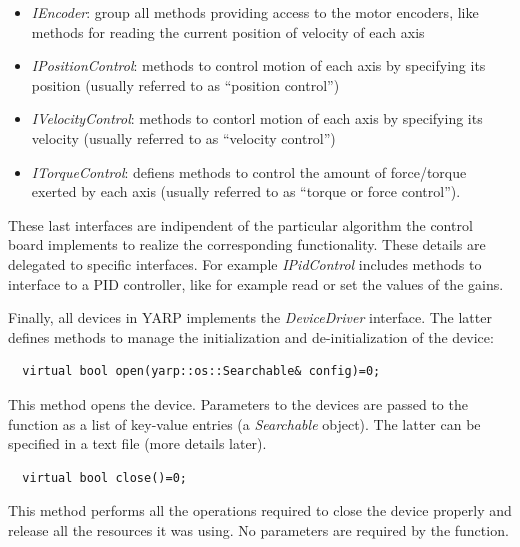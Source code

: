 \begin{itemize}

\item \emph{IEncoder}: group all methods providing access to the motor encoders, 
like methods for reading the current position of velocity of each axis

\item \emph{IPositionControl}: methods to control motion of each axis by specifying 
its position (usually referred to as ``position control'')

\item \emph{IVelocityControl}: methods to contorl motion of each axis by specifying 
its velocity (usually referred to as ``velocity control'')

\item \emph{ITorqueControl}: defiens methods to control the amount of force/torque 
exerted by each axis (usually referred to as ``torque or force control'').

\end{itemize}

These last interfaces are indipendent of the particular algorithm the control
board implements to realize the corresponding functionality. These details are 
delegated to specific interfaces. For example \emph{IPidControl} includes 
methods to interface to a PID controller, like for example read or set the 
values of the gains.

Finally, all devices in YARP implements the \emph{DeviceDriver} interface. 
The latter defines methods to manage the initialization and de-initialization of 
the device: 

\begin{verbatim}
  virtual bool open(yarp::os::Searchable& config)=0;
\end{verbatim}

This method opens the device. Parameters to the devices are passed to the
function as a list of key-value entries (a \emph{Searchable} object). The latter 
can be specified in a text file (more details later).

\begin{verbatim}
  virtual bool close()=0;
\end{verbatim}

This method performs all the operations required to close the 
device properly and release all the resources it was using. No
parameters are required by the function.


